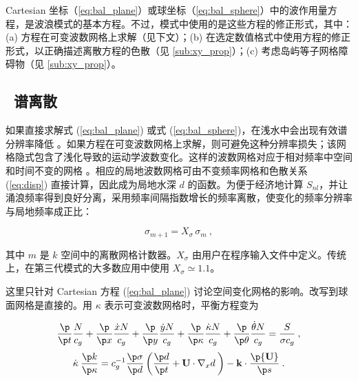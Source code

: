 Cartesian 坐标（\ref{eq:bal_plane}）或球坐标（\ref{eq:bal_sphere}）中的波作用量方程，是波浪模式的基本方程。不过，模式中使用的是这些方程的修正形式，其中：(a) 方程在可变波数网格上求解（见下文）；(b) 在选定数值格式中使用方程的修正形式，以正确描述离散方程的色散（见 \para\ref{sub:xy_prop}）；(c) 考虑岛屿等子网格障碍物（见 \para\ref{sub:xy_prop}）。


\vssub
\subsection{~谱离散} \label{sec:basic_num}
\vsssub


如果直接求解式 (\ref{eq:bal_plane}) 或式 (\ref{eq:bal_sphere})，在浅水中会出现有效谱分辨率降低 \citep[见][]{tol:GAOS98b}。如果方程在可变波数网格上求解，则可避免这种分辨率损失；该网格隐式包含了浅化导致的运动学波数变化。这样的波数网格对应于相对频率中空间和时间不变的网格 \citep{tol:GAOS98b}。相应的局地波数网格可由不变频率网格和色散关系 (\ref{eq:disp}) 直接计算，因此成为局地水深 $d$ 的函数。为便于经济地计算 $S_{nl}$，并让涌浪频率得到良好分离，采用频率间隔指数增长的频率离散，使变化的频率分辨率与局地频率成正比：


\begin{equation}
\sigma_{m+1} = X_\sigma \, \sigma_m \: , \label{eq:sigma_grid}
\end{equation}

\noindent
其中 $m$ 是 $k$ 空间中的离散网格计数器。$X_\sigma$ 由用户在程序输入文件中定义。传统上，在第三代模式的大多数应用中使用 $X_\sigma \simeq 1.1$。

这里只针对 Cartesian 方程 (\ref{eq:bal_plane}) 讨论空间变化网格的影响。改写到球面网格是直接的。用 $\kappa$ 表示可变波数网格时，平衡方程变为


\begin{equation}
\frac{\p}{\p t} \frac{N}{c_g} +  
\frac{\p}{\p x} \frac{\dot{x} N}{c_g} + 
\frac{\p}{\p y} \frac{\dot{y} N}{c_g} + 
\frac{\p}{\p \kappa} \frac{\dot{\kappa} N}{c_g} + 
\frac{\p}{\p \theta} \frac{\dot{\theta} N}{c_g}  =
\frac{S}{\sigma c_g} \: , \label{eq:bal_f_grid} \end{equation} \begin{equation}
\dot{\kappa} \:\frac{\p k}{\p \kappa} =
     c_g^{-1} \frac{\p \sigma}{\p d} \left (
    \frac{\p d}{\p t} + {\bf U} \cdot \nabla_x d \: \right ) -
    {\bf k} \cdot \frac{\p {\bf U}}{\p s}
\: . \label{eq:sigma_dot}
\end{equation}

